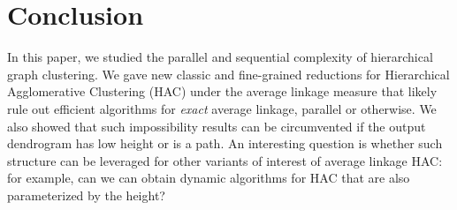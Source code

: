 \section{Conclusion}
In this paper, we studied the parallel and sequential complexity of hierarchical
graph clustering. We gave new classic and fine-grained reductions for Hierarchical Agglomerative Clustering (HAC) under the average linkage
measure that likely rule out efficient algorithms for {\em exact} average linkage, parallel or otherwise. 
We also showed that such impossibility results can be circumvented if the output dendrogram has low height or is a path. An interesting question is whether such structure can be leveraged for other variants of interest of average linkage HAC: for example, can we can obtain dynamic algorithms for HAC that are also parameterized by the height?
